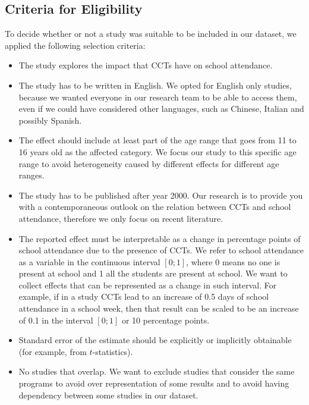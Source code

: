 \documentclass[a4paper, 10pt]{article}
\begin{document}
\subsection{Criteria for Eligibility} 

To decide whether or not a study was suitable to be included in our dataset, we applied the following selection criteria:
\begin{itemize}
    \item The study explores the impact that CCTs have on school attendance.
    \item The study has to be written in English. We opted for English only studies, because we wanted everyone in our research team to be able to access them, even if we could have considered other languages, such as Chinese, Italian and possibly Spanish.
    \item The effect should include at least part of the age range that goes from 11 to 16 years old as the affected category. We focus our study to this specific age range to avoid heterogeneity caused by different effects for different age ranges.
    \item The study has to be published after year 2000. Our research is to provide you with a contemporaneous outlook on the relation between CCTs and school attendance, therefore we only focus on recent literature.
    \item The reported effect must be interpretable as a change in percentage points of school attendance due to the presence of CCTs. We refer to school attendance as a variable in the continuous interval $[0;1]$, where 0 means no one is present at school and 1 all the students are present at school. We want to collect effects that can be represented as a change in such interval. For example, if in a study CCTs lead to an increase of 0.5 days of school attendance in a school week, then that result can be scaled to be an increase of 0.1 in the interval $[0;1]$ or 10 percentage points.
    \item Standard error of the estimate should be explicitly or implicitly obtainable (for example, from $t$-statistics).
    \item No studies that overlap. We want to exclude studies that consider the same programs to avoid over representation of some results and to avoid having dependency between some studies in our dataset.
\end{itemize}
\end{document}
